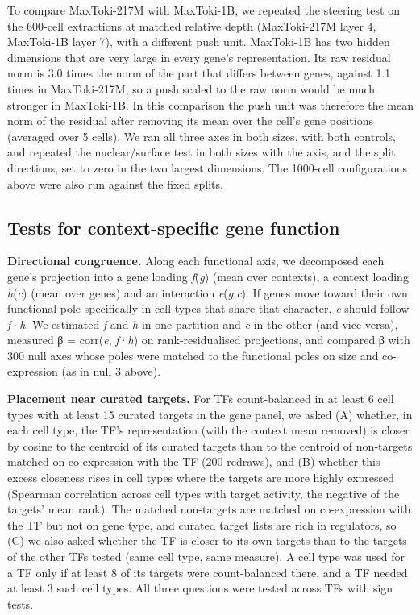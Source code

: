 \documentclass[
  11pt,
]{article}
\begin{document}
To compare MaxToki-217M with MaxToki-1B, we repeated the steering test
on the 600-cell extractions at matched relative depth (MaxToki-217M
layer 4, MaxToki-1B layer 7), with a different push unit. MaxToki-1B has
two hidden dimensions that are very large in every gene's
representation. Its raw residual norm is 3.0 times the norm of the part
that differs between genes, against 1.1 times in MaxToki-217M, so a push
scaled to the raw norm would be much stronger in MaxToki-1B. In this
comparison the push unit was therefore the mean norm of the residual
after removing its mean over the cell's gene positions (averaged over 5
cells). We ran all three axes in both sizes, with both controls, and
repeated the nuclear/surface test in both sizes with the axis, and the
split directions, set to zero in the two largest dimensions. The
1000-cell configurations above were also run against the fixed splits.

\subsection{Tests for context-specific gene
function}\label{tests-for-context-specific-gene-function}

\textbf{Directional congruence.} Along each functional axis, we
decomposed each gene's projection into a gene loading \emph{f}(\emph{g})
(mean over contexts), a context loading \emph{h}(\emph{c}) (mean over
genes) and an interaction \emph{e}(\emph{g},\emph{c}). If genes move
toward their own functional pole specifically in cell types that share
that character, \emph{e} should follow \emph{f}·\emph{h}. We estimated
\emph{f} and \emph{h} in one partition and \emph{e} in the other (and
vice versa), measured β = corr(\emph{e}, \emph{f}·\emph{h}) on
rank-residualised projections, and compared β with 300 null axes whose
poles were matched to the functional poles on size and co-expression (as
in null 3 above).

\textbf{Placement near curated targets.} For TFs count-balanced in at
least 6 cell types with at least 15 curated targets in the gene panel,
we asked (A) whether, in each cell type, the TF's representation (with
the context mean removed) is closer by cosine to the centroid of its
curated targets than to the centroid of non-targets matched on
co-expression with the TF (200 redraws), and (B) whether this excess
closeness rises in cell types where the targets are more highly
expressed (Spearman correlation across cell types with target activity,
the negative of the targets' mean rank). The matched non-targets are
matched on co-expression with the TF but not on gene type, and curated
target lists are rich in regulators, so (C) we also asked whether the TF
is closer to its own targets than to the targets of the other TFs tested
(same cell type, same measure). A cell type was used for a TF only if at
least 8 of its targets were count-balanced there, and a TF needed at
least 3 such cell types. All three questions were tested across TFs with
sign tests.
\end{document}
